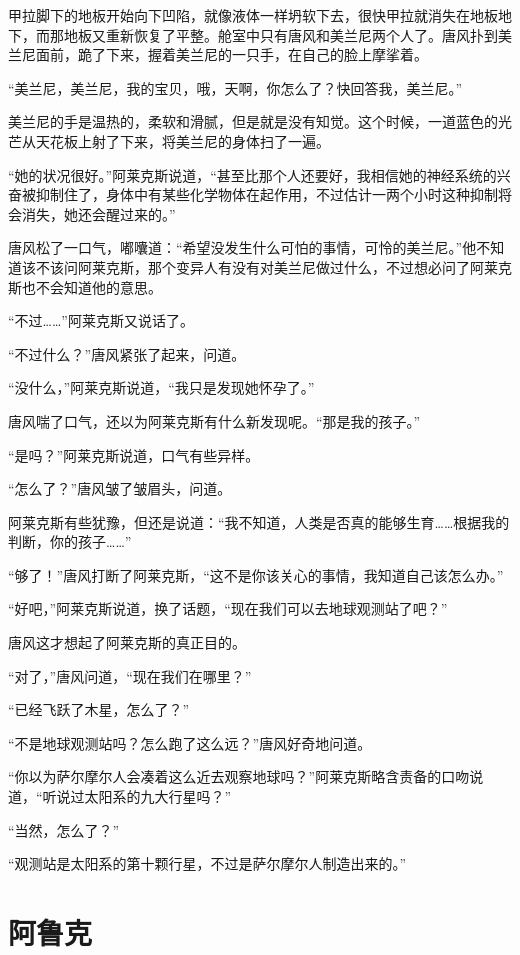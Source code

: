 甲拉脚下的地板开始向下凹陷，就像液体一样坍软下去，很快甲拉就消失在地板地下，而那地板又重新恢复了平整。舱室中只有唐风和美兰尼两个人了。唐风扑到美兰尼面前，跪了下来，握着美兰尼的一只手，在自己的脸上摩挲着。

“美兰尼，美兰尼，我的宝贝，哦，天啊，你怎么了？快回答我，美兰尼。”

美兰尼的手是温热的，柔软和滑腻，但是就是没有知觉。这个时候，一道蓝色的光芒从天花板上射了下来，将美兰尼的身体扫了一遍。

“她的状况很好。”阿莱克斯说道，“甚至比那个人还要好，我相信她的神经系统的兴奋被抑制住了，身体中有某些化学物体在起作用，不过估计一两个小时这种抑制将会消失，她还会醒过来的。”

唐风松了一口气，嘟囔道：“希望没发生什么可怕的事情，可怜的美兰尼。”他不知道该不该问阿莱克斯，那个变异人有没有对美兰尼做过什么，不过想必问了阿莱克斯也不会知道他的意思。

“不过……”阿莱克斯又说话了。

“不过什么？”唐风紧张了起来，问道。

“没什么，”阿莱克斯说道，“我只是发现她怀孕了。”

唐风喘了口气，还以为阿莱克斯有什么新发现呢。“那是我的孩子。”

“是吗？”阿莱克斯说道，口气有些异样。

“怎么了？”唐风皱了皱眉头，问道。

阿莱克斯有些犹豫，但还是说道：“我不知道，人类是否真的能够生育……根据我的判断，你的孩子……”

“够了！”唐风打断了阿莱克斯，“这不是你该关心的事情，我知道自己该怎么办。”

“好吧，”阿莱克斯说道，换了话题，“现在我们可以去地球观测站了吧？”

唐风这才想起了阿莱克斯的真正目的。

“对了，”唐风问道，“现在我们在哪里？”

“已经飞跃了木星，怎么了？”

“不是地球观测站吗？怎么跑了这么远？”唐风好奇地问道。

“你以为萨尔摩尔人会凑着这么近去观察地球吗？”阿莱克斯略含责备的口吻说道，“听说过太阳系的九大行星吗？”

“当然，怎么了？”

“观测站是太阳系的第十颗行星，不过是萨尔摩尔人制造出来的。”

\chapter{阿鲁克}

